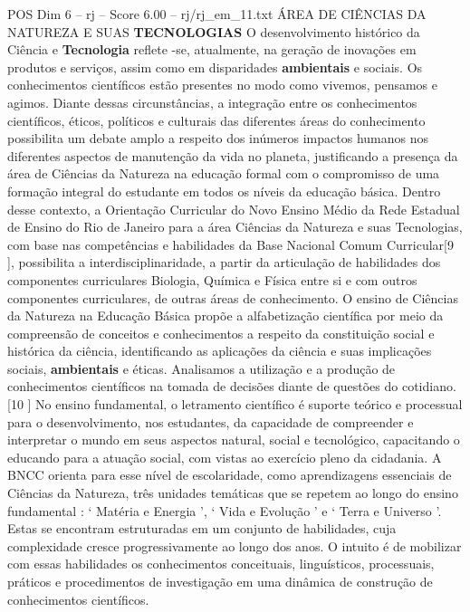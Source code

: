 \begin{textsample}{POS Dim 6 – rj – Score 6.00 – rj/rj\_em\_11.txt}  \label{ex:f6_pos_275}
ÁREA DE CIÊNCIAS DA NATUREZA E SUAS \textbf{TECNOLOGIAS} O desenvolvimento histórico da Ciência e \textbf{Tecnologia} reflete -se, atualmente, na geração de inovações em produtos e serviços, assim como em disparidades \textbf{ambientais} e sociais.
Os conhecimentos científicos estão presentes no modo como vivemos, pensamos e agimos.
Diante dessas circunstâncias, a integração entre os conhecimentos científicos, éticos, políticos e culturais das diferentes áreas do conhecimento possibilita um debate amplo a respeito dos inúmeros impactos humanos nos diferentes aspectos de manutenção da vida no planeta, justificando a presença da área de Ciências da Natureza na educação formal com o compromisso de uma formação integral do estudante em todos os níveis da educação básica.
Dentro desse contexto, a Orientação Curricular do Novo Ensino Médio da Rede Estadual de Ensino do Rio de Janeiro para a área Ciências da Natureza e suas Tecnologias, com base nas competências e habilidades da Base Nacional Comum Curricular[9 ], possibilita a interdisciplinaridade, a partir da articulação de habilidades dos componentes curriculares Biologia, Química e Física entre si e com outros componentes curriculares, de outras áreas de conhecimento.
O ensino de Ciências da Natureza na Educação Básica propõe a alfabetização científica por meio da compreensão de conceitos e conhecimentos a respeito da constituição social e histórica da ciência, identificando as aplicações da ciência e suas implicações sociais, \textbf{ambientais} e éticas.
Analisamos a utilização e a produção de conhecimentos científicos na tomada de decisões diante de questões do cotidiano.[10 ] No ensino fundamental, o letramento científico é suporte teórico e processual para o desenvolvimento, nos estudantes, da capacidade de compreender e interpretar o mundo em seus aspectos natural, social e tecnológico, capacitando o educando para a atuação social, com vistas ao exercício pleno da cidadania.
A BNCC orienta para esse nível de escolaridade, como aprendizagens essenciais de Ciências da Natureza, três unidades temáticas que se repetem ao longo do ensino fundamental : ‘ Matéria e Energia ’, ‘ Vida e Evolução ’ e ‘ Terra e Universo ’.
Estas se encontram estruturadas em um conjunto de habilidades, cuja complexidade cresce progressivamente ao longo dos anos.
O intuito é de mobilizar com essas habilidades os conhecimentos conceituais, linguísticos, processuais, práticos e procedimentos de investigação em uma dinâmica de construção de conhecimentos científicos.

\end{textsample}
